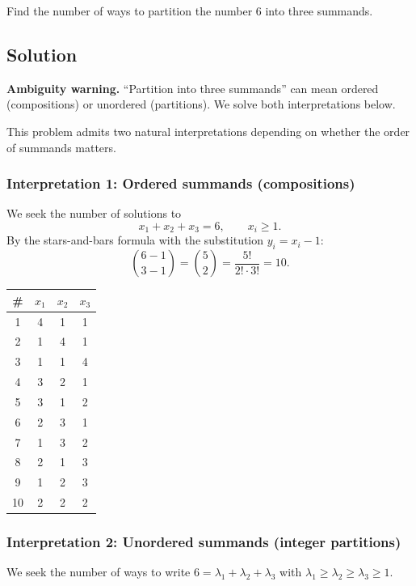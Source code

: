 \documentclass[12pt, a4paper]{article}
\begin{document}
\begin{problembox}
Find the number of ways to partition the number $6$ into three summands.
\end{problembox}

\subsection*{Solution}

\textbf{Ambiguity warning.}\; ``Partition into three summands'' can mean ordered (compositions) or unordered (partitions). We solve both interpretations below.

This problem admits two natural interpretations depending on whether
the order of summands matters.

\subsubsection*{Interpretation 1: Ordered summands (compositions)}

We seek the number of solutions to
\[
  x_1 + x_2 + x_3 = 6, \qquad x_i \ge 1.
\]
By the stars-and-bars formula with the substitution $y_i = x_i - 1$:
\[
  \binom{6-1}{3-1} = \binom{5}{2} = \frac{5!}{2!\cdot 3!} = 10.
\]

\begin{center}
\renewcommand{\arraystretch}{1.15}
\begin{tabular}{cccc}
\toprule
\textbf{\#} & $x_1$ & $x_2$ & $x_3$ \\
\midrule
1  & 4 & 1 & 1 \\
2  & 1 & 4 & 1 \\
3  & 1 & 1 & 4 \\
4  & 3 & 2 & 1 \\
5  & 3 & 1 & 2 \\
6  & 2 & 3 & 1 \\
7  & 1 & 3 & 2 \\
8  & 2 & 1 & 3 \\
9  & 1 & 2 & 3 \\
10 & 2 & 2 & 2 \\
\bottomrule
\end{tabular}
\end{center}

\subsubsection*{Interpretation 2: Unordered summands (integer partitions)}

We seek the number of ways to write $6 = \lambda_1 + \lambda_2 + \lambda_3$
with $\lambda_1 \ge \lambda_2 \ge \lambda_3 \ge 1$.
\end{document}
